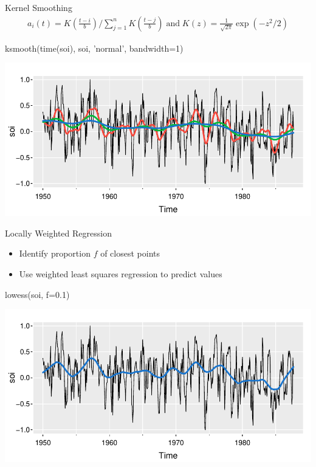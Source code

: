 \documentclass[ignorenonframetext,xcolor=x11names]{beamer}
\begin{document}
\begin{frame}[fragile]{Kernel Smoothing}
\begin{align*}a_i(t) = K\left(\frac{t-i}{b}\right) / \sum_{j=1}^n K \left(\frac{t-j}{b}\right) \; \text{and} \; K(z) = \frac{1}{\sqrt{2\pi}} \exp(-z^2/2) \end{align*}
\begin{Rcode}
ksmooth(time(soi), soi, 'normal', bandwidth=1)
\end{Rcode}
\begin{center}
\includegraphics[width=.75\textwidth]{figure15.pdf}
\end{center}
\end{frame}

\begin{frame}[fragile]{Locally Weighted Regression}
\begin{itemize}
   \item Identify proportion $f$ of closest points
   \item Use weighted least squares regression to predict values
\end{itemize}
\begin{Rcode}
lowess(soi, f=0.1)
\end{Rcode}
\begin{center}
\includegraphics[width=.75\textwidth]{figure16.pdf}
\end{center}
\end{frame}
\end{document}

